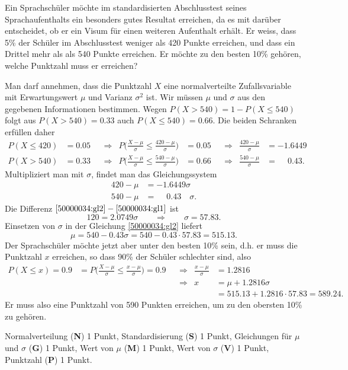 Ein Sprachschüler möchte im standardisierten Abschlusstest seines
Sprachaufenthalts
ein besonders gutes Resultat erreichen, da es mit darüber entscheidet,
ob er ein Visum für einen weiteren Aufenthalt erhält.
Er weiss, dass 5\% der Schüler im Abschlusstest weniger als 420 Punkte
erreichen, und dass ein Drittel mehr als als 540 Punkte erreichen.
Er möchte zu den besten 10\% gehören, welche Punktzahl muss
er erreichen?


\begin{loesung}
Man darf annehmen, dass die Punktzahl $X$ eine normalverteilte
Zufallsvariable mit Erwartungswert $\mu$ und Varianz $\sigma^2$ ist.
Wir müssen $\mu$ und $\sigma$ aus den gegebenen Informationen bestimmen.
Wegen $P(X>540)=1-P(X\le 540)$ folgt aus $P(X>540)=0.33$ auch
$P(X\le 540)=0.66$.
Die beiden Schranken erfüllen daher
\begin{align*}
P(X\le 420)&= 0.05
&
&\Rightarrow
&
P\biggl(\frac{X-\mu}{\sigma}\le \frac{420-\mu}{\sigma}\biggr)
&=
0.05
&&\Rightarrow
&
\frac{420-\mu}{\sigma}
&=
-1.6449
\\
P(X> 540)&=0.33
&
&\Rightarrow
&
P\biggl(\frac{X-\mu}{\sigma}\le \frac{540-\mu}{\sigma}\biggr)
&=
0.66
&&\Rightarrow&
\frac{540-\mu}{\sigma}
&=
\phantom{-}
0.43.
\end{align*}
Multipliziert man mit $\sigma$, findet man das Gleichungssystem
\begin{align}
420-\mu&=-1.6449\sigma
\label{50000034:gl1}
\\
540-\mu&=\phantom{-}0.43\phantom{00}\sigma.
\label{50000034:gl2}
\end{align}
Die Differenz
$
\eqref{50000034:gl2}
-
\eqref{50000034:gl1}
$
ist
\[
120=2.0749\sigma
\qquad\Rightarrow\qquad
\sigma=57.83.
\]
Einsetzen von $\sigma$ in der Gleichung
\eqref{50000034:gl2}
liefert
\[
\mu=540-0.43\sigma=540-0.43\cdot 57.83=515.13.
\]
Der Sprachschüler möchte jetzt aber unter den besten 10\% sein, d.h. er
muss die Punktzahl $x$ erreichen, so dass 90\% der Schüler schlechter sind,
also
\begin{align*}
P(X\le x)=0.9
&=
P\biggl(\frac{X-\mu}{\sigma}\le \frac{x-\mu}{\sigma}\biggr)=0.9
&&\Rightarrow&
\frac{x-\mu}{\sigma} &= 1.2816
\\
&
&&\Rightarrow&
x &= \mu+1.2816\sigma
\\
&&&&
  &=515.13 + 1.2816\cdot 57.83=589.24.
\end{align*}
Er muss also eine Punktzahl von 590 Punkten erreichen, um zu den
obersten 10\% zu gehören.
\end{loesung}

\begin{bewertung}
Normalverteilung ({\bf N}) 1 Punkt,
Standardisierung ({\bf S}) 1 Punkt,
Gleichungen für $\mu$ und $\sigma$ ({\bf G}) 1 Punkt,
Wert von $\mu$ ({\bf M}) 1 Punkt,
Wert von $\sigma$ ({\bf V}) 1 Punkt,
Punktzahl ({\bf P}) 1 Punkt.
\end{bewertung}


